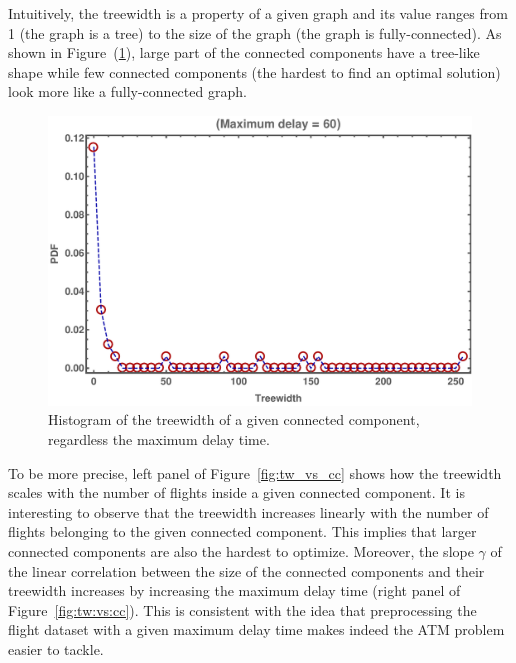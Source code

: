 Intuitively, the treewidth is a property of a given graph and its value ranges
from 1 (the graph is a tree) to the size of the graph (the graph is
fully-connected). As shown in Figure~(\ref{fig:hist_tw}), large part of the
connected components have a tree-like shape while few connected components (the
hardest to find an optimal solution) look more like a fully-connected graph.

\begin{figure}
  \includegraphics[width=\columnwidth]{pics/instances/treewidth_histogram.pdf}
  \caption{\label{fig:hist_tw}Histogram of the treewidth of a given connected
  component, regardless the maximum delay time.}
\end{figure}

To be more precise, left panel of Figure~\ref{fig:tw_vs_cc} shows how the
treewidth scales with the number of flights inside a given connected component.
It is interesting to observe that the treewidth increases linearly with the
number of flights belonging to the given connected component. This implies that
larger connected components are also the hardest to optimize. Moreover, the
slope $\gamma$ of the linear correlation between the size of the connected
components and their treewidth increases by increasing the maximum delay time
(right panel of Figure~\ref{fig:tw:vs:cc}). This is consistent with the
idea that preprocessing the flight dataset with a given maximum delay time makes
indeed the ATM problem easier to tackle.

